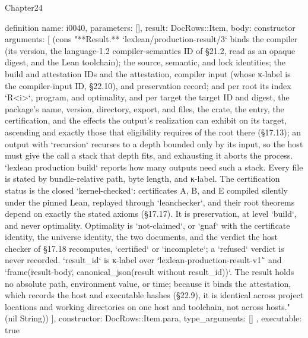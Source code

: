 \begin{lexlean}{Chapter24}
\begin{semanticmodule}
definition{
  name: i0040,
  parameters: [],
  result: DocRows::Item,
  body: constructor{
    arguments: [
      (cons "**Result.** `lexlean/production-result/3` binds the compiler (its version, the language-1.2 compiler-semantics ID of §21.2, read as an opaque digest, and the Lean toolchain); the source, semantic, and lock identities; the build and attestation IDs and the attestation, compiler input (whose κ-label is the compiler-input ID, §22.10), and preservation record; and per root its index `R<i>`, program, and optimality, and per target the target ID and digest, the package's name, version, directory, export, and files, the crate, the entry, the certification, and the effects the output's realization can exhibit on its target, ascending and exactly those that eligibility requires of the root there (§17.13); an output with `recursion` recurses to a depth bounded only by its input, so the host must give the call a stack that depth fits, and exhausting it aborts the process. `lexlean production build` reports how many outputs need such a stack. Every file is stated by bundle-relative path, byte length, and κ-label. The certification status is the closed `kernel-checked`: certificates A, B, and E compiled silently under the pinned Lean, replayed through `leanchecker`, and their root theorems depend on exactly the stated axioms (§17.17). It is preservation, at level `build`, and never optimality. Optimality is `not-claimed`, or `gnaf` with the certificate identity, the universe identity, the two documents, and the verdict the host checker of §17.18 recomputes, `certified` or `incomplete`; a `refused` verdict is never recorded. `result_id` is κ-label over `\"lexlean-production-result-v1\"` and `frame(\"result-body\", canonical_json(result without result_id))`. The result holds no absolute path, environment value, or time; because it binds the attestation, which records the host and executable hashes (§22.9), it is identical across project locations and working directories on one host and toolchain, not across hosts." (nil String))
    ],
    constructor: DocRows::Item.para,
    type_arguments: []
  },
  executable: true
}


\end{semanticmodule}
\end{lexlean}
